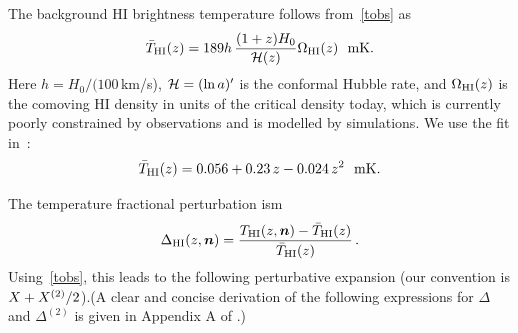 The background HI brightness temperature follows from~\eqref{tobs} as~\cite{Villaescusa-Navarro:2018vsg}
\begin{equation} \label{bart}
\bar{T}_{{\mathrm{HI}}}(z)= 189h\,\frac{(1+z)H_0}{\mathcal{H}(z)}\Omega_{{\mathrm{HI}}}(z)~~\mathrm{mK}.
\end{equation}
Here $h=H_0/(100\,$km/s), $\mathcal{H}=(\ln a)'$ is the conformal Hubble rate, and $\Omega_{{\mathrm{HI}}}(z)$ is the comoving HI density in units of the critical density today, which is currently poorly constrained by observations and is modelled by simulations. We use the fit in~\cite{Santos:2017qgq}:
\begin{equation}
\bar{T}_{{\mathrm{HI}}}(z) = 0.0 56 +0.23\,z -0.024\, z^{2} ~~ \mathrm{mK}. \label{e1.24}
\end{equation}

The temperature fractional perturbation ism
\begin{equation}
\Delta_{{\mathrm{HI}}}(z,\bm {n}) = \frac{T_{{\mathrm{HI}}}(z,\bm {n}) - \bar{T}_{{\mathrm{HI}}} (z)}{\bar{T}_{{\mathrm{HI}}} (z)}\,.\label{e1.1_02}
\end{equation}
Using~\eqref{tobs}, this leads to the following perturbative expansion (our convention is $X+X^{{(2)}}/2$).(A clear and concise derivation of the following expressions for $\Delta$ and $\Delta^{(2)}$ is given in Appendix A of \cite{DiDio:2018zmk}.)
